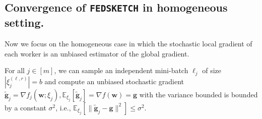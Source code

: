 \subsection{Convergence of  \texttt{FEDSKETCH} in homogeneous setting.} 
Now we focus on the homogeneous case in which the stochastic local gradient of each worker is an unbiased estimator of the global gradient.


\begin{assumption}\label{Assu:1.5}
For all $j\in [m]$, we can sample an independent mini-batch $\ell_j$   of size $|\xi_j^{(\ell,r)}| = b$ and compute an unbiased stochastic gradient  $\tilde{\mathbf{g}}_j = \nabla f_j(\boldsymbol{w}; \xi_j), \mathbb{E}_{\xi_j}[\tilde{\mathbf{g}}_j] = \nabla f(\boldsymbol{w})=\mathbf{g}$ with  the variance bounded is bounded by a constant $\sigma^2$, i.e., $
\mathbb{E}_{\xi_j}\left[\|\tilde{\mathbf{g}}_j-\mathbf{g}\|^2\right]\leq \sigma^2$.
\end{assumption}



